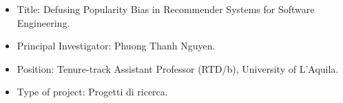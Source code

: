 \begin{itemize}
	\item Title: Defusing Popularity Bias in Recommender Systems for Software Engineering.
	\item Principal Investigator: Phuong Thanh Nguyen.
	\item Position: Tenure-track Assistant Professor (RTD/b), University of L'Aquila.
	\item Type of project: Progetti di ricerca.
\end{itemize}
